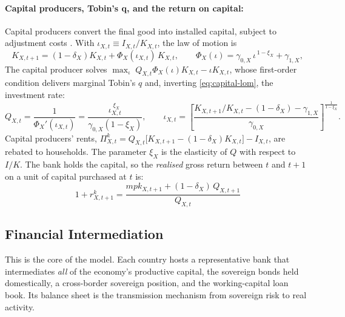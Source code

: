 \paragraph{Capital producers, Tobin's q, and the return on capital:}
Capital producers convert the final good into installed capital, subject to adjustment costs \cite{jermann1998asset}. With $\iota_{X,t}\equiv I_{X,t}/K_{X,t}$, the law of motion is
\begin{equation}
K_{X,t+1}=(1-\delta_X)K_{X,t}+\Phi_X(\iota_{X,t})\,K_{X,t},
\qquad
\Phi_X(\iota)=\gamma_{0,X}\,\iota^{\,1-\xi_X}+\gamma_{1,X},
\label{eq:capital-lom}
\end{equation}
The capital producer solves $\max_{\iota}\;Q_{X,t}\Phi_X(\iota)K_{X,t}-\iota K_{X,t}$, whose first-order condition delivers marginal Tobin's $q$ and, inverting
\eqref{eq:capital-lom}, the investment rate:
\begin{equation}
Q_{X,t}=\frac{1}{\Phi_X'(\iota_{X,t})}
      =\frac{\iota_{X,t}^{\;\xi_X}}{\gamma_{0,X}(1-\xi_X)},
\qquad
\iota_{X,t}=\left[\frac{K_{X,t+1}/K_{X,t}-(1-\delta_X)-\gamma_{1,X}}
                       {\gamma_{0,X}}\right]^{\frac{1}{1-\xi_X}} .
\label{eq:tobins-q}
\end{equation}
Capital producers' rents, $\Pi^{k}_{X,t}=Q_{X,t}\bigl[K_{X,t+1}-(1-\delta_X)K_{X,t}\bigr]-I_{X,t}$,
are rebated to households. The parameter $\xi_X$ is the elasticity of $Q$ with respect
to $I/K$. The bank holds the capital, so the \emph{realised} gross return between $t$ and $t+1$
on a unit of capital purchased at $t$ is:
\begin{equation}
\;1+r^{k}_{X,t+1}=\frac{mpk_{X,t+1}+(1-\delta_X)\,Q_{X,t+1}}{Q_{X,t}}\
\label{eq:rk}
\end{equation}

\subsection{Financial Intermediation}
This is the core of the model. Each country hosts a representative bank that intermediates \emph{all} of the economy's productive capital, the sovereign bonds held domestically, a cross-border sovereign position, and the working-capital loan
book. Its balance sheet is the transmission mechanism from sovereign risk to real
activity.

